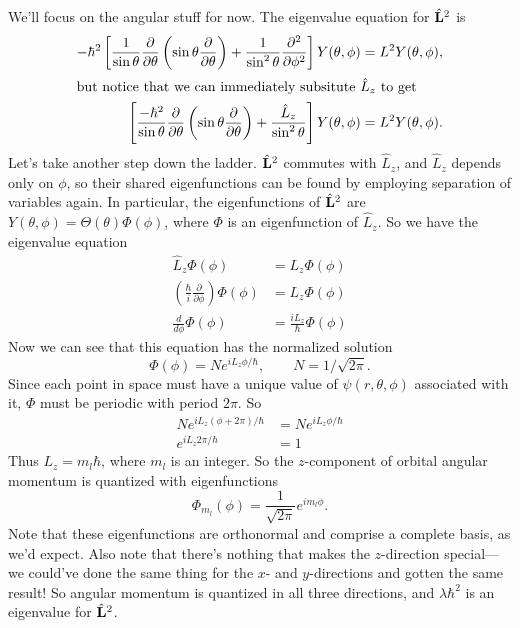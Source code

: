 \documentclass[../p052main.tex]{subfiles}
\begin{document}
We'll focus on the angular stuff for now.
The eigenvalue equation for $\hat{\mathbf{L}}^2$ is
\begin{align*}
    -\hbar^2 \left[ \frac{1}{\sin \theta} \frac{\partial}{\partial \theta} \left( \sin \theta \frac{\partial}{\partial \theta} \right) + \frac{1}{\sin^2 \theta} \frac{\partial^2}{\partial \phi^2} \right] Y(\theta, \phi) &= L^2 Y (\theta, \phi), \\
    \intertext{but notice that we can immediately subsitute $\hat L_z$ to get}
    \left[ \frac{-\hbar^2}{\sin \theta} \frac{\partial}{\partial \theta} \left( \sin \theta \frac{\partial}{\partial \theta} \right) + \frac{\hat L_z}{\sin^2 \theta} \right] Y(\theta, \phi) &= L^2 Y (\theta, \phi).
\end{align*}
Let's take another step down the ladder.
$\hat{\mathbf{L}}^2$ commutes with $\hat L_z$, and $\hat L_z$ depends only on $\phi$, so their shared eigenfunctions can be found by employing separation of variables again.
In particular, the eigenfunctions of $\hat{\mathbf{L}}^2$ are $Y(\theta, \phi) = \Theta (\theta) \Phi (\phi)$, where $\Phi$ is an eigenfunction of $\hat L_z$.
So we have the eigenvalue equation
\begin{align*}
    \hat L_z \Phi(\phi) &= L_z \Phi (\phi) \\
   \left( \frac{\hbar}{i} \frac{\partial}{\partial \phi} \right) \Phi(\phi) &= L_z \Phi (\phi) \\
   \frac{d}{d\phi} \Phi(\phi) &= \frac{iL_z}{\hbar} \Phi(\phi)
\end{align*}
Now we can see that this equation has the normalized solution
\[ \Phi(\phi) = N e^{i L_z \phi / \hbar}, \qquad N = 1 / \sqrt{2\pi}. \]
Since each point in space must have a unique value of $\psi(r,\theta,\phi)$ associated with it, $\Phi$ must be periodic with period $2\pi$.
So
\begin{align*}
    Ne^{iL_z (\phi + 2\pi) / \hbar} &= Ne^{iL_z \phi / \hbar} \\
    e^{iL_z 2\pi / \hbar} &= 1
\end{align*}
Thus $L_z = m_l \hbar$, where $m_l$ is an integer.
So the $z$-component of orbital angular momentum is quantized with eigenfunctions
\[ \Phi_{m_l}(\phi) = \frac{1}{\sqrt{2\pi}} e^{im_l \phi}. \]
Note that these eigenfunctions are orthonormal and comprise a complete basis, as we'd expect.
Also note that there's nothing that makes the $z$-direction special---we could've done the same thing for the $x$- and $y$-directions and gotten the same result!
So angular momentum is quantized in all three directions, and $\lambda \hbar^2$ is an eigenvalue for $\hat{\mathbf{L}}^2$.
\end{document}
